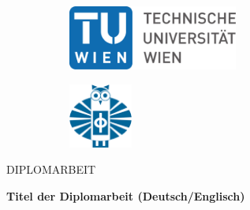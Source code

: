 \newcommand{\thesistitle}{Titel der Diplomarbeit (Deutsch/Englisch)}
\newcommand{\thesisdegree}{Diplom-Ingenieur/in}
\newcommand{\thesisstudies}{Bezeichnung des Studiums}
\newcommand{\thesisauthor}{Martina Muster}
\newcommand{\thesisstudentnumber}{01234567}
\newcommand{\thesisinstitute}{XYZ}
\newcommand{\thesisfaculty}{XYZ}
\newcommand{\thesisuniversity}{Technischen Universit\"{a}t Wien}
\newcommand{\thesiscollaboration}{XYZ}
\newcommand{\thesissupervisor}{Titel Dr. Vorname Familienname}
\newcommand{\thesiscosupervisor}{Univ.-Ass. Dr. Vorname Familienname}
\newcommand{\thesisplace}{Wien}
\newcommand{\thesisdate}{TT.MM.JJJJ}

\thispagestyle{empty}

\begin{titlepage}

  \begingroup
  \selectfont

  \begin{figure}[h]
    \centering
    \begin{subfigure}{.5\textwidth}
      \flushleft
      \includegraphics[height=60pt]{figs/TU_Logo.pdf}
    \end{subfigure}%
    \begin{subfigure}{.5\textwidth}
      \flushright
      \includegraphics[height=60pt]{figs/fakultaet-physik_logo.png}
    \end{subfigure}
  \end{figure}

  \vspace*{1.5cm}
  
  \begin{center}
    {\Large DIPLOMARBEIT}
    
    \vspace{2.25cm}
    
    {\huge\textbf{\thesistitle}}


\end{center}
\end{titlepage}
